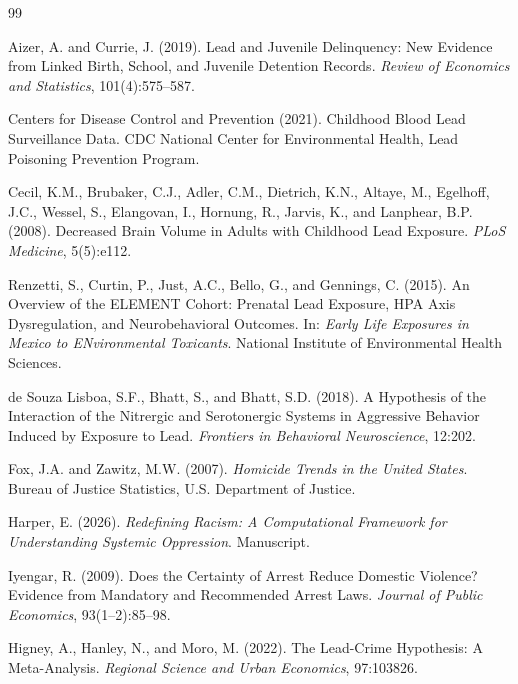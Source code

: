 \documentclass[12pt, letterpaper]{article}
\begin{document}
\begin{thebibliography}{99}

Aizer, A. and Currie, J. (2019).
\newblock Lead and Juvenile Delinquency: New Evidence from Linked Birth, School, and Juvenile Detention Records.
\newblock \textit{Review of Economics and Statistics}, 101(4):575--587.

Centers for Disease Control and Prevention (2021).
\newblock Childhood Blood Lead Surveillance Data.
\newblock CDC National Center for Environmental Health, Lead Poisoning Prevention Program.

Cecil, K.M., Brubaker, C.J., Adler, C.M., Dietrich, K.N., Altaye, M., Egelhoff, J.C., Wessel, S., Elangovan, I., Hornung, R., Jarvis, K., and Lanphear, B.P. (2008).
\newblock Decreased Brain Volume in Adults with Childhood Lead Exposure.
\newblock \textit{PLoS Medicine}, 5(5):e112.

Renzetti, S., Curtin, P., Just, A.C., Bello, G., and Gennings, C. (2015).
\newblock An Overview of the ELEMENT Cohort: Prenatal Lead Exposure, HPA Axis Dysregulation, and Neurobehavioral Outcomes.
\newblock In: \textit{Early Life Exposures in Mexico to ENvironmental Toxicants}. National Institute of Environmental Health Sciences.

de Souza Lisboa, S.F., Bhatt, S., and Bhatt, S.D. (2018).
\newblock A Hypothesis of the Interaction of the Nitrergic and Serotonergic Systems in Aggressive Behavior Induced by Exposure to Lead.
\newblock \textit{Frontiers in Behavioral Neuroscience}, 12:202.

Fox, J.A. and Zawitz, M.W. (2007).
\newblock \textit{Homicide Trends in the United States}.
\newblock Bureau of Justice Statistics, U.S. Department of Justice.

Harper, E. (2026).
\newblock \textit{Redefining Racism: A Computational Framework for Understanding Systemic Oppression}.
\newblock Manuscript.

Iyengar, R. (2009).
\newblock Does the Certainty of Arrest Reduce Domestic Violence? Evidence from Mandatory and Recommended Arrest Laws.
\newblock \textit{Journal of Public Economics}, 93(1--2):85--98.

Higney, A., Hanley, N., and Moro, M. (2022).
\newblock The Lead-Crime Hypothesis: A Meta-Analysis.
\newblock \textit{Regional Science and Urban Economics}, 97:103826.


\end{thebibliography}
\end{document}
